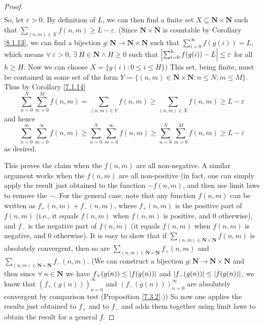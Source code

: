\begin{proof}
\begin{align*}
    \end{align*}
    So, let \(\varepsilon > 0\).
    By definition of \(L\), we can then find a finite set \(X \subseteq \mathbf{N} \times \mathbf{N}\) such that \(\sum_{(n, m) \in X} f(n, m) \geq L - \varepsilon\).
    (Since \(\mathbf{N} \times \mathbf{N}\) is countable by Corollary \ref{8.1.13}, we can find a bijection \(g : \mathbf{N} \to \mathbf{N} \times \mathbf{N}\) such that \(\sum_{i = 0}^\infty f(g(i)) = L\), which means \(\forall\ \varepsilon > 0\), \(\exists\ H \in \mathbf{N} \land H \geq 0\) such that \(\abs*{\sum_{i = 0}^h f(g(i)) - L} \leq \varepsilon\) for all \(h \geq H\).
    Now we can choose \(X = \{g(i) : 0 \leq i \leq H\}\))
    This set, being finite, must be contained in some set of the form \(Y \coloneqq \{(n,m) \in \mathbf{N} \times \mathbf{N} : n \leq N; m \leq M \}\).
    Thus by Corollary \ref{7.1.14}
    \[
        \sum_{n = 0}^N \sum_{m = 0}^M f(n, m) = \sum_{(n, m) \in Y} f(n, m) \geq \sum_{(n, m) \in X} f(n, m) \geq L - \varepsilon
    \]
    and hence
    \[
        \sum_{n = 0}^\infty \sum_{m = 0}^\infty f(n, m) \geq \sum_{n = 0}^N \sum_{m = 0}^\infty f(n, m) \geq \sum_{n = 0}^N \sum_{m = 0}^M f(n, m) \geq L - \varepsilon
    \]
    as desired.

    This proves the claim when the \(f(n, m)\) are all non-negative.
    A similar argument works when the \(f(n, m)\) are all non-positive
    (in fact, one can simply apply the result just obtained to the function \(-f(n, m)\), and then use limit laws to remove the \(-\).
    For the general case, note that any function \(f(n, m)\) can be written as \(f_+(n, m) + f_-(n, m)\), where \(f_+(n, m)\) is the positive part of \(f(n, m)\)
    (i.e., it equals \(f(n, m)\) when \(f(n, m)\) is positive, and \(0\) otherwise),
    and \(f_-\) is the negative part of \(f(n, m)\)
    (it equals \(f(n, m)\) when \(f(n, m)\) is negative, and \(0\) otherwise).
    It is easy to show that if \(\sum_{(n, m) \in \mathbf{N} \times \mathbf{N}} f(n, m)\) is absolutely convergent, then so are \(\sum_{(n, m) \in \mathbf{N} \times \mathbf{N}} f_+(n, m)\) and \(\sum_{(n, m) \in \mathbf{N} \times \mathbf{N}} f_-(n, m)\).
    (We can construct a bijection \(g : \mathbf{N} \to \mathbf{N} \times \mathbf{N}\) and then since \(\forall\ n \in \mathbf{N}\) we have \(f_+(g(n)) \leq \abs*{f(g(n))}\) and \(\abs*{f_-(g(n))} \leq \abs*{f(g(n))}\), we know that \((f_+(g(n)))_{n = 0}^\infty\) and \((f_-(g(n)))_{n = 0}^\infty\) are absolutely convergent by comparison test (Proposition \ref{7.3.2}.))
    So now one applies the results just obtained to \(f_+\) and to \(f_-\) and adds them together using limit laws to obtain the result for a general \(f\).
\end{proof}

